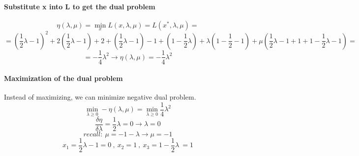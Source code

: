 \documentclass[12pt]{article}
\begin{document}
\paragraph{Substitute x into L to get the dual problem}
\[\eta(\lambda , \mu) = \min_x L(x, \lambda, \mu) = L(x^*, \lambda, \mu) = \]
\[= (\frac{1}{2} \lambda - 1)^2 +2(\frac{1}{2} \lambda - 1)+2+(\frac{1}{2} \lambda - 1)-1+(1 - \frac{1}{2} \lambda)+ \lambda(1 - \frac{1}{2} - 1) + \mu(\frac{1}{2} \lambda - 1 + 1 + 1 - \frac{1}{2} \lambda - 1) = \]
\[= - \frac{1}{4} \lambda ^2 \longrightarrow \eta(\lambda , \mu) = - \frac{1}{4} \lambda ^2\]
\paragraph{Maximization of the dual problem}
Instead of maximizing, we can minimize negative dual problem.
\[ \min_{\lambda \geq 0} -\eta(\lambda , \mu) = \min_{\lambda \geq 0} \frac{1}{4} \lambda ^2\]
\[\frac{\delta \eta}{\delta \lambda} = \frac{1}{2} \lambda = 0 \longrightarrow \lambda=0 \]
\[recall: \ \mu = -1 - \lambda \longrightarrow \mu = -1\]
\[x_1 = \frac{1}{2} \lambda -1 = 0 \ , \ x_2 =1 \ , \ x_3 = 1 - \frac{1}{2} \lambda\ = 1\]
\end{document}
